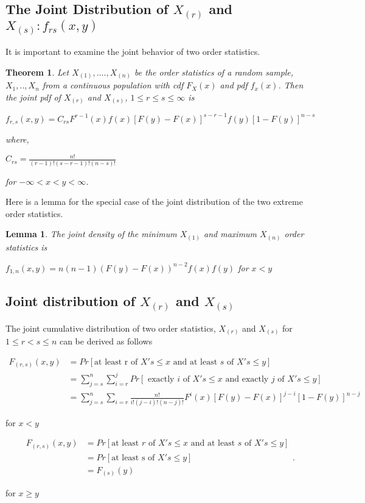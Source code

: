 \documentclass[11pt,a4paper]{article}
\theoremstyle{plain}
\newtheorem{thm}[fact]{Theorem}
\newtheorem{lem}[fact]{Lemma}
\begin{document}
\subsection*{The Joint Distribution of $X_{(r)}$ and $X_{(s)}:f_{rs}(x,y)$}
It is important to examine the joint behavior of two order statistics.
\begin{thm}
Let $X_{(1)},....,X_{(n)}$ be the order statistics of a random sample, $X_1,..,X_n$ from a continuous population with cdf $F_X(x)$ and pdf $f_x(x)$. Then the joint pdf of $X_{(r)}$ and $X_{(s)}$, $1\leq r \leq s \leq \infty$ is
\begin{center}
$f_{r,s}(x,y)=C_{rs}F^{r-1}(x)f(x)[F(y)-F(x)]^{s-r-1}f(y)[1-F(y)]^{n-s}$
\end{center}
where, 
\begin{center}
$C_{rs}=\frac{n!}{(r-1)!(s-r-1)!(n-s)!}$
\end{center}
for $-\infty<x<y<\infty$.
\end{thm}

Here is a lemma for the special case of the joint distribution of the two extreme order statistics. 
\begin{lem}
The joint density of the minimum $X_{(1)}$ and maximum $X_{(n)}$ order statistics is 
\begin{center}
$f_{1,n}(x,y)= n(n-1)(F(y)-F(x))^{n-2}f(x)f(y)$ for $x<y$ 

\end{center}
\end{lem}
\subsection*{Joint distribution of $X_{(r)}$ and $X_{(s)}$}
The joint cumulative distribution of two order statistics, $X_{(r)}$ and $X_{(s)}$ for $1 \leq r < s \leq n$ can be derived as follows
\begin{center}

     \[
     \begin{array}{ll}
F_{(r,s)}(x,y)&=Pr[\text {at least r of $X's \leq x$ and at least $s$ of $X's \leq y$}]\\
&=\sum_{j=s}^n\sum_{i=r}^jPr[\text{ exactly $i$ of $X's \leq x$ and exactly $j$ of $X's \leq y$}]\\
&=\sum_{j=s}^n\sum_{i=r}\frac{n!}{i!(j-i)!(n-j)!}F^i(x)[F(y)-F(x)]^{j-i}[1-F(y)]^{n-j}
\end{array}
\]
\end{center}
for $x<y$
\begin{center}
\[
     \begin{array}{ll}
F_{(r,s)}(x,y)&=Pr[\text{at least $r$ of $X's \leq x$ and at least $s$ of $X's \leq y$}]\\
&=Pr[\text {at least s of $X's \leq y$}]\\
&=F_{(s)}(y)
\end{array}
             .
   \]

\end{center}
for $x \geq y$
\end{document}
